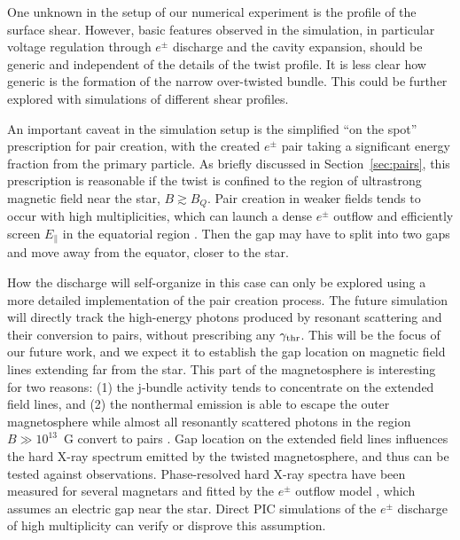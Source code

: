 One unknown in the setup of our numerical experiment is the profile of the
surface shear. However, basic features observed in the simulation, in particular
voltage regulation through $e^\pm$ discharge and the cavity expansion, should be
generic and independent of the details of the twist profile. It is less clear
how generic is the formation of the narrow over-twisted bundle. This could be
further explored with simulations of different shear profiles.

An important caveat in the simulation setup is the simplified ``on the spot''
prescription for pair creation, with the created $e^\pm$ pair taking a
significant energy fraction from the primary particle. As briefly discussed in
Section~\ref{sec:pairs}, this prescription is reasonable if the twist is
confined to the region of ultrastrong magnetic field near the star, $B\gtrsim
B_Q$. Pair creation in weaker fields tends to occur with high multiplicities,
which can launch a dense $e^\pm$ outflow and efficiently screen $E_\parallel$ in
the equatorial region \citep{beloborodov_mechanism_2013}. Then the gap may have to
split into two gaps and move away from the equator, closer to the star.

How the discharge will self-organize in this case can only be explored using a
more detailed implementation of the pair creation process. The future simulation
will directly track the high-energy photons produced by resonant
scattering and their conversion to pairs, without prescribing any $\gamma_{\rm thr}$.
This will be the focus of our future work, and we expect it to establish the gap location
on magnetic field lines extending far from the star. This part of the magnetosphere is
interesting for two reasons: (1) the j-bundle activity tends to
concentrate on the extended field lines, and (2) the nonthermal emission
is able to escape the outer magnetosphere while almost all resonantly scattered
photons in the region $B\gg10^{13}$~G convert to pairs \citep{beloborodov_mechanism_2013}.
Gap location on the extended field lines influences the hard X-ray spectrum
emitted by the twisted magnetosphere, and thus can be tested against observations.
Phase-resolved hard X-ray spectra have been measured for several magnetars
and fitted by the $e^\pm$ outflow model
\citetext{e.g. \citealp{hascoet_phase-resolved_2014}; \citealp{an_deep_2015}},
which assumes an electric gap near the star. Direct PIC simulations of the $e^\pm$
discharge
of high
multiplicity can verify or disprove this assumption.


